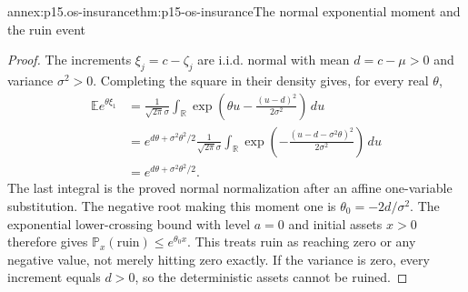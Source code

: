 \begin{annexitem}{annex:p15.os-insurance}{thm:p15-os-insurance}{The normal exponential moment and the ruin event}
\begin{proof}
The increments \(\xi_j=c-\zeta_j\) are i.i.d. normal with
mean \(d=c-\mu>0\) and variance \(\sigma^2>0\).
Completing the square in their density gives, for every real
\(\theta\),
\[
 \begin{split}
 \mathbb Ee^{\theta\xi_1}
 &=\frac1{\sqrt{2\pi}\sigma}
   \int_{\mathbb R}
     \exp\left(\theta u-\frac{(u-d)^2}{2\sigma^2}\right)\,du\\
 &=e^{d\theta+\sigma^2\theta^2/2}
   \frac1{\sqrt{2\pi}\sigma}
   \int_{\mathbb R}
     \exp\left(-\frac{(u-d-\sigma^2\theta)^2}{2\sigma^2}\right)\,du\\
 &=e^{d\theta+\sigma^2\theta^2/2}.
 \end{split}
 \]
The last integral is the proved normal normalization after an
affine one-variable substitution.
The negative root making this moment one is
\(\theta_0=-2d/\sigma^2\).
The exponential lower-crossing bound with level \(a=0\)
and initial assets \(x>0\) therefore gives
\(\mathbb P_x(\text{ruin})\leq e^{\theta_0x}\).
This treats ruin as reaching zero or any negative value,
not merely hitting zero exactly.
If the variance is zero, every increment equals \(d>0\),
so the deterministic assets cannot be ruined.
\end{proof}
\end{annexitem}

